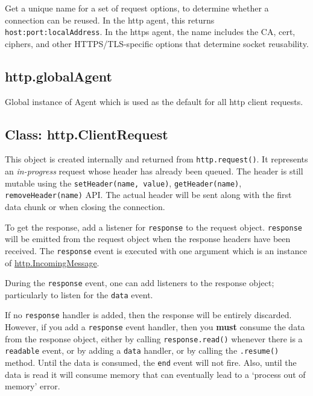 Get a unique name for a set of request options, to determine whether a
connection can be reused. In the http agent, this returns
\texttt{host:port:localAddress}. In the https agent, the name includes
the CA, cert, ciphers, and other HTTPS/TLS-specific options that
determine socket reusability.

\subsection{http.globalAgent}\label{http.globalagent}

Global instance of Agent which is used as the default for all http
client requests.

\subsection{Class: http.ClientRequest}\label{class-http.clientrequest}

This object is created internally and returned from
\texttt{http.request()}. It represents an \emph{in-progress} request
whose header has already been queued. The header is still mutable using
the \texttt{setHeader(name,\ value)}, \texttt{getHeader(name)},
\texttt{removeHeader(name)} API. The actual header will be sent along
with the first data chunk or when closing the connection.

To get the response, add a listener for
\texttt{\textquotesingle{}response\textquotesingle{}} to the request
object. \texttt{\textquotesingle{}response\textquotesingle{}} will be
emitted from the request object when the response headers have been
received. The \texttt{\textquotesingle{}response\textquotesingle{}}
event is executed with one argument which is an instance of
\hyperref[httpux5fhttpux5fincomingmessage]{http.IncomingMessage}.

During the \texttt{\textquotesingle{}response\textquotesingle{}} event,
one can add listeners to the response object; particularly to listen for
the \texttt{\textquotesingle{}data\textquotesingle{}} event.

If no \texttt{\textquotesingle{}response\textquotesingle{}} handler is
added, then the response will be entirely discarded. However, if you add
a \texttt{\textquotesingle{}response\textquotesingle{}} event handler,
then you \textbf{must} consume the data from the response object, either
by calling \texttt{response.read()} whenever there is a
\texttt{\textquotesingle{}readable\textquotesingle{}} event, or by
adding a \texttt{\textquotesingle{}data\textquotesingle{}} handler, or
by calling the \texttt{.resume()} method. Until the data is consumed,
the \texttt{\textquotesingle{}end\textquotesingle{}} event will not
fire. Also, until the data is read it will consume memory that can
eventually lead to a `process out of memory' error.

